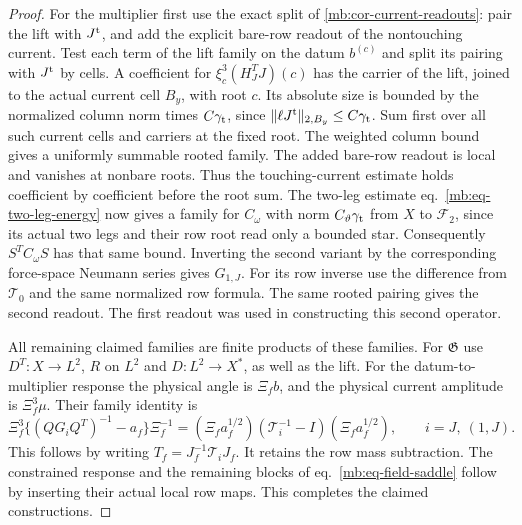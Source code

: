 \documentclass[11pt,letterpaper,reqno]{amsart}
\numberwithin{equation}{section}
\renewcommand{\eqref}[1]{\textup{eq.~\ref{#1}}}
\theoremstyle{definition}
\theoremstyle{remark}
\begin{document}
\begin{proof}
For the multiplier first use the exact split of \cref{mb:cor-current-readouts}: pair the lift with \(J^{\rm t}\), and add the explicit bare-row readout of the nontouching current. Test each term of the lift family on the datum \(b^{(c)}\) and split its pairing with \(J^{\rm t}\) by cells. A coefficient for \(\xi_c^3(H_J^T J)(c)\) has the carrier of the lift, joined to the actual current cell \(B_y\), with root \(c\). Its absolute size is bounded by the normalized column norm times \(C\gamma_{\rm t}\), since \(\|\ell J^{\rm t}\|_{2,B_y}\le C\gamma_{\rm t}\). Sum first over all such current cells and carriers at the fixed root. The weighted column bound gives a uniformly summable rooted family. The added bare-row readout is local and vanishes at nonbare roots. Thus the touching-current estimate holds coefficient by coefficient before the root sum. The two-leg estimate \eqref{mb:eq-two-leg-energy} now gives a family for \(C_\omega\) with norm \(C_\vartheta\gamma_{\rm t}\) from \(X\) to \(\mathcal F_2\), since its actual two legs and their row root read only a bounded star. Consequently \(S^T C_\omega S\) has that same bound. Inverting the second variant by the corresponding force-space Neumann series gives \(G_{1,J}\). For its row inverse use the difference from \(\mathcal T_0\) and the same normalized row formula. The same rooted pairing gives the second readout. The first readout was used in constructing this second operator.

All remaining claimed families are finite products of these families. For \(\mathfrak G\) use \(D^T:X\to L^2\), \(R\) on \(L^2\) and \(D:L^2\to X^*\), as well as the lift. For the datum-to-multiplier response the physical angle is \(\Xi_f b\), and the physical current amplitude is \(\Xi_f^3\mu\). Their family identity is
\begin{equation}\label{mb:eq-mass-removed-family}
 \Xi_f^3\{(QG_iQ^T)^{-1}-a_f\}\Xi_f^{-1}
      =(\Xi_f a_f^{1/2})(\mathcal T_i^{-1}-I)(\Xi_f a_f^{1/2}),
 \qquad i=J,\ (1,J).
\end{equation}
This follows by writing \(T_f=J_f^{-1}\mathcal T_iJ_f\). It retains the row mass subtraction. The constrained response and the remaining blocks of \eqref{mb:eq-field-saddle} follow by inserting their actual local row maps. This completes the claimed constructions.
\end{proof}
\end{document}
